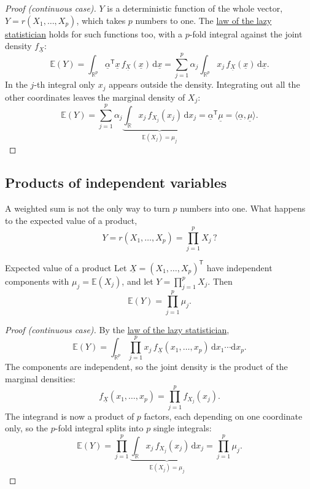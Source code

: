 \documentclass[a4paper,12pt,oneside]{report}
\begin{document}
\begin{proof}[Proof (continuous case)]
$Y$ is a deterministic function of the whole vector,
$Y=r(X_1,\ldots,X_p)$, which takes $p$ numbers to one. The
\hyperref[sec:lazy]{law of the lazy statistician} holds for such functions
too, with a $p$-fold integral against the joint density
$f_{\underline{X}}$:
\[
\mathbb{E}(Y)=\int_{\mathbb{R}^p}\underline{\alpha}^{\mathsf T}\underline{x}\,f_{\underline{X}}(\underline{x})\,\mathrm{d}\underline{x}
=\sum_{j=1}^p\alpha_j\int_{\mathbb{R}^p}x_j\,f_{\underline{X}}(\underline{x})\,\mathrm{d}\underline{x}.
\]
In the $j$-th integral only $x_j$ appears outside the density. Integrating
out all the other coordinates leaves the marginal density of $X_j$:
\[
\mathbb{E}(Y)=\sum_{j=1}^p\alpha_j\underbrace{\int_{\mathbb{R}}x_j\,f_{X_j}(x_j)\,\mathrm{d}x_j}_{\mathbb{E}(X_j)=\mu_j}
=\underline{\alpha}^{\mathsf T}\underline{\mu}
=\langle\underline{\alpha},\underline{\mu}\rangle .
\]
\end{proof}

\subsection{Products of independent variables}\label{sec:product}

A weighted sum is not the only way to turn $p$ numbers into one. What
happens to the expected value of a product,
\[
Y=r(X_1,\ldots,X_p)=\prod_{j=1}^pX_j\,?
\]

\begin{framedprop}{Expected value of a product}\label{prop:product}
Let $\underline{X}=(X_1,\ldots,X_p)^{\mathsf T}$ have independent
components with $\mu_j=\mathbb{E}(X_j)$, and let $Y=\prod_{j=1}^pX_j$. Then
\[
\mathbb{E}(Y)=\prod_{j=1}^p\mu_j .
\]
\end{framedprop}

\begin{proof}[Proof (continuous case)]
By the \hyperref[sec:lazy]{law of the lazy statistician},
\[
\mathbb{E}(Y)=\int_{\mathbb{R}^p}\prod_{j=1}^px_j\,f_{\underline{X}}(x_1,\ldots,x_p)\,\mathrm{d}x_1\cdots\mathrm{d}x_p .
\]
The components are independent, so the joint density is the product of the
marginal densities:
\[
f_{\underline{X}}(x_1,\ldots,x_p)=\prod_{j=1}^pf_{X_j}(x_j).
\]
The integrand is now a product of $p$ factors, each depending on one
coordinate only, so the $p$-fold integral splits into $p$ single integrals:
\[
\mathbb{E}(Y)=\prod_{j=1}^p\underbrace{\int_{\mathbb{R}}x_j\,f_{X_j}(x_j)\,\mathrm{d}x_j}_{\mathbb{E}(X_j)=\mu_j}
=\prod_{j=1}^p\mu_j .
\]
\end{proof}
\end{document}
